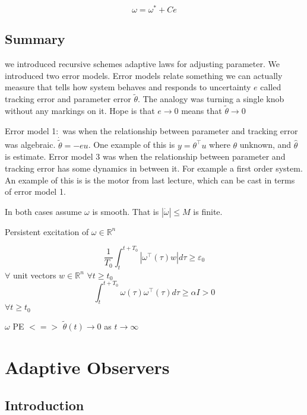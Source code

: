 \begin{equation*}
\omega=\omega^{*}+Ce
\end{equation*}

\section{Summary}

we introduced recursive schemes \textemdash{} adaptive laws for adjusting parameter.
We introduced two error models.
Error models relate something we can actually measure that tells how system behaves and responds to uncertainty $e$ called tracking error and parameter error $\tilde{\theta}$.
The analogy was turning a single knob without any markings on it.
Hope is that $e\rightarrow0$ means that $\tilde{\theta}\rightarrow0$

Error model 1:\ was when the relationship between parameter and tracking error was algebraic.
$\dot{\tilde{\theta}}=-eu$.
One example of this is $y=\theta^{\top}u$ where $\theta$ unknown, and $\hat{\theta}$ is estimate.
Error model 3 was when the relationship between parameter and tracking error has some dynamics in between it.
For example a first order system.
An example of this is is the motor from last lecture, which can be cast in terms of error model 1.

In both cases assume $\omega$ is smooth.
That is $|\dot{\omega}|\leq M$ is finite.

Persistent excitation of $\omega\in\mathbb{R}^{n}$

\begin{equation*}
  \frac{1}{T_{0}}\int_{t}^{t+T_{0}}|\omega^{\top}(\tau)w|d\tau\geq\varepsilon_{0}
\end{equation*}
$\forall$ unit vectors $w\in\mathbb{R}^{n}$ $\forall t\geq t_{0}$
\begin{equation*}
  \int_{t}^{t+T_{0}}\omega(\tau)\omega^{\top}(\tau)d\tau\geq\alpha I>0
\end{equation*}
$\forall t\geq t_{0}$

$\omega$ PE $<=>$ $\tilde{\theta}(t)\rightarrow0$ as $t\rightarrow\infty$

\chapter{Adaptive Observers}

\section{Introduction}

